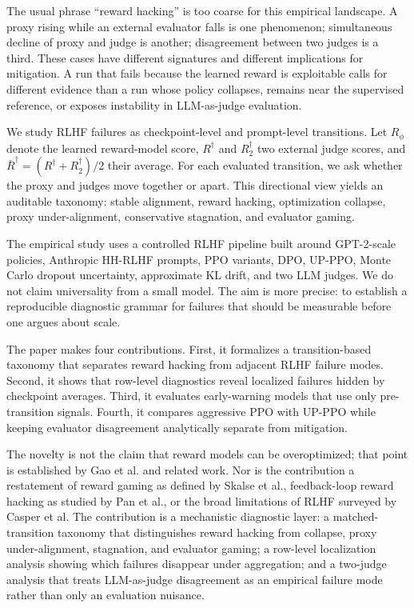 \documentclass[11pt]{article}
\newcommand{\Rphi}{R_{\phi}}
\newcommand{\Rdag}{R^{\dagger}}
\newcommand{\Rtwo}{R^{\dagger}_2}
\newcommand{\Rbar}{\bar R^{\dagger}}
\begin{document}
The usual phrase ``reward hacking'' is too coarse for this empirical landscape. A proxy rising while an external evaluator falls is one phenomenon; simultaneous decline of proxy and judge is another; disagreement between two judges is a third. These cases have different signatures and different implications for mitigation. A run that fails because the learned reward is exploitable calls for different evidence than a run whose policy collapses, remains near the supervised reference, or exposes instability in LLM-as-judge evaluation.

We study RLHF failures as checkpoint-level and prompt-level transitions. Let $\Rphi$ denote the learned reward-model score, $\Rdag$ and $\Rtwo$ two external judge scores, and $\Rbar=(\Rdag+\Rtwo)/2$ their average. For each evaluated transition, we ask whether the proxy and judges move together or apart. This directional view yields an auditable taxonomy: stable alignment, reward hacking, optimization collapse, proxy under-alignment, conservative stagnation, and evaluator gaming.

The empirical study uses a controlled RLHF pipeline built around GPT-2-scale policies, Anthropic HH-RLHF prompts, PPO variants, DPO, UP-PPO, Monte Carlo dropout uncertainty, approximate KL drift, and two LLM judges. We do not claim universality from a small model. The aim is more precise: to establish a reproducible diagnostic grammar for failures that should be measurable before one argues about scale.

The paper makes four contributions. First, it formalizes a transition-based taxonomy that separates reward hacking from adjacent RLHF failure modes. Second, it shows that row-level diagnostics reveal localized failures hidden by checkpoint averages. Third, it evaluates early-warning models that use only pre-transition signals. Fourth, it compares aggressive PPO with UP-PPO while keeping evaluator disagreement analytically separate from mitigation.

The novelty is not the claim that reward models can be overoptimized; that point is established by Gao et al. and related work. Nor is the contribution a restatement of reward gaming as defined by Skalse et al., feedback-loop reward hacking as studied by Pan et al., or the broad limitations of RLHF surveyed by Casper et al. \cite{casper2023open} The contribution is a mechanistic diagnostic layer: a matched-transition taxonomy that distinguishes reward hacking from collapse, proxy under-alignment, stagnation, and evaluator gaming; a row-level localization analysis showing which failures disappear under aggregation; and a two-judge analysis that treats LLM-as-judge disagreement as an empirical failure mode rather than only an evaluation nuisance.
\end{document}
